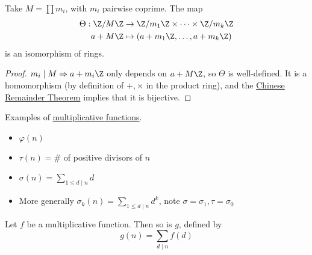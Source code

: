 \documentclass{article}
\begin{document}
\begin{nthm}
    Take $M = \prod m_i$, with $ m_i$ pairwise coprime.
    The map
    \begin{align*}
       \Theta : \Z/M\Z &\to \Z/m_1\Z \times \cdots \times \Z / m_k \Z \\
                       a + M \Z &\mapsto (a + m_1 \Z, \dotsc , a + m_k \Z )
    \end{align*}
    is an isomorphism of rings.
\end{nthm}

\begin{proof}
    $m_i \mid M \Rightarrow a+m_i \Z$ only depends on $a + M\Z$, so $\Theta$ is well-defined.
    It is a homomorphism (by definition of $+, \times$ in the product ring), and the \hyperlink{thm:crt}{Chinese Remainder Theorem} implies that it is bijective.
\end{proof}


\begin{eg}
    Examples of \hyperlink{def:multiplicativeFunction}{multiplicative functions}.
    \begin{itemize}
        \item $\varphi(n)$
        \item $\tau (n) = \#$ of positive divisors of  $n$
        \item $\sigma (n) = \sum_{1 \leq d \mid n} d$
        \item More generally $\sigma_k (n) = \sum_{1 \leq d \mid n} d^k$, note $\sigma = \sigma_1, \tau = \sigma_0$
    \end{itemize}
\end{eg}

\begin{nlemma}\label{lem:2_4}
    Let $f$ be a multiplicative function. Then so is $g$, defined by \begin{equation} g(n) = \sum_{d \mid n} f(d) \end{equation}
\end{nlemma}
\end{document}
